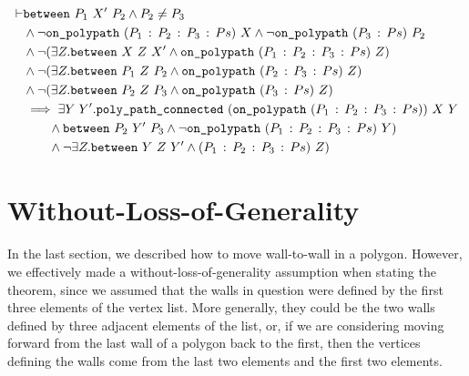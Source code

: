 \begin{equation}\label{eq:PolygonMove}
  \begin{split}
\vdash    &\texttt{between}\ P_1\ X'\ P_2 \wedge P_2 \neq P_3\\
    &\wedge \neg\texttt{on\_polypath}\ (P_1\,:\,P_2\,:\,P_3\,:\,Ps)\ X \wedge \neg\texttt{on\_polypath}\ (P_3\,:\,Ps)\ P_2\\
    &\wedge \neg(\exists Z. \texttt{between}\ X\ Z\ X' \wedge \texttt{on\_polypath}\ (P_1\,:\,P_2\,:\,P_3\,:\,Ps)\ Z)\\
    &\wedge \neg(\exists Z. \texttt{between}\ P_1\ Z\ P_2 \wedge \texttt{on\_polypath}\ (P_2\,:\,P_3\,:\,Ps)\ Z)\\
    &\wedge \neg(\exists Z. \texttt{between}\ P_2\ Z\ P_3 \wedge \texttt{on\_polypath}\ (P_3\,:\,Ps)\ Z)\\
    &\implies \exists Y\; Y'. \texttt{poly\_path\_connected}\ (\texttt{on\_polypath}\ (P_1\,:\,P_2\,:\,P_3\,:\,Ps))\ X\ Y\\
    &\qquad\wedge \texttt{between}\ P_2\ Y'\ P_3\wedge \neg\texttt{on\_polypath}\ (P_1\,:\,P_2\,:\,P_3\,:\,Ps)\ Y)\\
    &\qquad\wedge \neg\exists Z. \texttt{between}\ Y\ Z\ Y' \wedge (P_1\,:\,P_2\,:\,P_3\,:\,Ps)\ Z)
  \end{split}
\end{equation}

\section{Without-Loss-of-Generality}
In the last section, we described how to move wall-to-wall in a polygon. However, we effectively made a without-loss-of-generality assumption when stating the theorem, since we assumed that the walls in question were defined by the first three elements of the vertex list. More generally, they could be the two walls defined by  three adjacent elements of the list, or, if we are considering moving forward from the last wall of a polygon back to the first, then the vertices defining the walls come from the last two elements and the first two elements.


